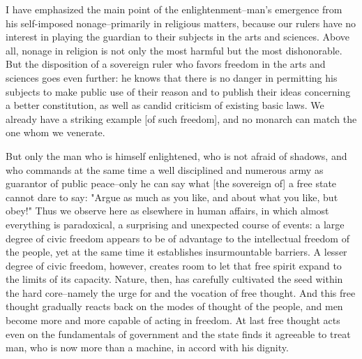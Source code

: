 \documentclass[12pt]{article}
\begin{document}
I have emphasized the main point of the enlightenment--man's emergence from his self-imposed nonage--primarily in religious matters, because our rulers have no interest in playing the guardian to their subjects in the arts and sciences. Above all, nonage in religion is not only the most harmful but the most dishonorable. But the disposition of a sovereign ruler who favors freedom in the arts and sciences goes even further: he knows that there is no danger in permitting his subjects to make public use of their reason and to publish their ideas concerning a better constitution, as well as candid criticism of existing basic laws. We already have a striking example [of such freedom], and no monarch can match the one whom we venerate.

But only the man who is himself enlightened, who is not afraid of shadows, and who commands at the same time a well disciplined and numerous army as guarantor of public peace--only he can say what [the sovereign of] a free state cannot dare to say: "Argue as much as you like, and about what you like, but obey!" Thus we observe here as elsewhere in human affairs, in which almost everything is paradoxical, a surprising and unexpected course of events: a large degree of civic freedom appears to be of advantage to the intellectual freedom of the people, yet at the same time it establishes insurmountable barriers. A lesser degree of civic freedom, however, creates room to let that free spirit expand to the limits of its capacity. Nature, then, has carefully cultivated the seed within the hard core--namely the urge for and the vocation of free thought. And this free thought gradually reacts back on the modes of thought of the people, and men become more and more capable of acting in freedom. At last free thought acts even on the fundamentals of government and the state finds it agreeable to treat man, who is now more than a machine, in accord with his dignity. 
\end{document}

